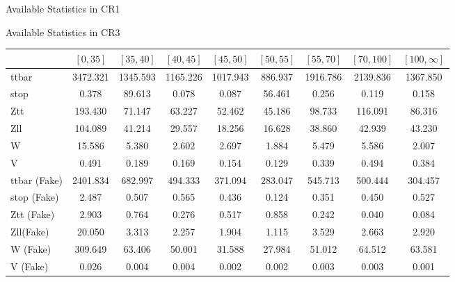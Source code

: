 \documentclass[aspectratio=46, 10pt, t]{beamer} %
\begin{document}
\begin{frame}{Available Statistics in CR1}
\end{frame}

\begin{frame}{Available Statistics in CR3}
  \begin{table}
    \begin{tabular}{lcccccccc}
      & $[0,35]$ & $[35,40]$ & $[40,45]$ & $[45,50]$  &  $[50,55]$ &  $[55,70]$ &  $[70, 100]$ & $[100, \infty]$ \\ \hline
      ttbar          & 3472.321  & 1345.593  & 1165.226  & 1017.943  & 886.937   & 1916.786  & 2139.836  & 1367.850   \\
      stop           & 0.378     & 89.613    & 0.078     & 0.087     & 56.461    & 0.256     & 0.119     & 0.158      \\
      Ztt            & 193.430   & 71.147    & 63.227    & 52.462    & 45.186    & 98.733    & 116.091   & 86.316     \\
      Zll            & 104.089   & 41.214    & 29.557    & 18.256    & 16.628    & 38.860    & 42.939    & 43.230     \\
      W              & 15.586    & 5.380     & 2.602     & 2.697     & 1.884     & 5.479     & 5.586     & 2.007      \\
      V              & 0.491     & 0.189     & 0.169     & 0.154     & 0.129     & 0.339     & 0.494     & 0.384      \\
      ttbar (Fake)   & 2401.834  & 682.997   & 494.333   & 371.094   & 283.047   & 545.713   & 500.444   & 304.457    \\
      stop (Fake)    & 2.487     & 0.507     & 0.565     & 0.436     & 0.124     & 0.351     & 0.450     & 0.527      \\
      Ztt (Fake)     & 2.903     & 0.764     & 0.276     & 0.517     & 0.858     & 0.242     & 0.040     & 0.084      \\
      Zll(Fake)      & 20.050    & 3.313     & 2.257     & 1.904     & 1.115     & 3.529     & 2.663     & 2.920      \\
      W (Fake)       & 309.649   & 63.406    & 50.001    & 31.588    & 27.984    & 51.012    & 64.512    & 63.581     \\
      V (Fake)       & 0.026     & 0.004     & 0.004     & 0.002     & 0.002     & 0.003     & 0.003     & 0.001      \\
    \end{tabular}
  \end{table}


\end{frame}
\end{document}
